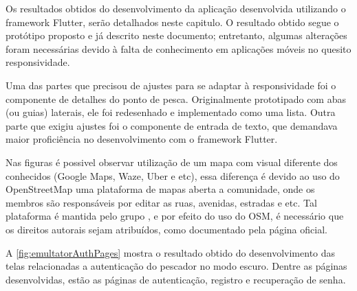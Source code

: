 Os resultados obtidos do desenvolvimento da aplicação desenvolvida utilizando o framework Flutter, serão detalhados neste capitulo. O resultado obtido segue o protótipo proposto e já descrito neste documento; entretanto, algumas alterações foram necessárias devido à falta de conhecimento em aplicações móveis no quesito responsividade.

Uma das partes que precisou de ajustes para se adaptar à responsividade foi o componente de detalhes do ponto de pesca. Originalmente prototipado com abas (ou guias) laterais, ele foi redesenhado e implementado como uma lista. Outra parte que exigiu ajustes foi o componente de entrada de texto, que demandava maior proficiência no desenvolvimento com o framework Flutter.

Nas figuras é possivel observar utilização de um mapa com visual diferente dos conhecidos (Google Maps, Waze, Uber e etc), essa diferença é devido ao uso do OpenStreetMap uma plataforma de mapas aberta a comunidade, onde os membros são responsáveis por editar as ruas, avenidas, estradas e etc. Tal plataforma é mantida pelo grupo , e por efeito do uso do OSM, é necessário que os direitos autorais sejam atribuídos, como documentado pela página oficial.


A \autoref{fig:emultatorAuthPages} mostra o resultado obtido do desenvolvimento das telas relacionadas a autenticação do pescador no modo escuro. Dentre as páginas desenvolvidas, estão as páginas de autenticação, registro e recuperação de senha.


